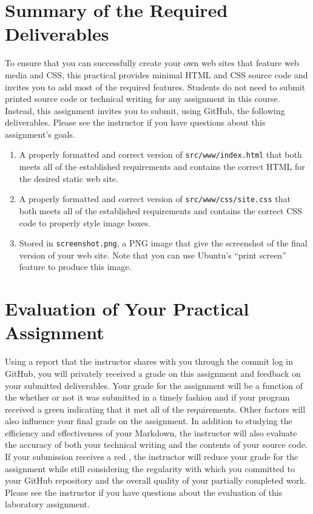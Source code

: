 \documentclass[11pt]{article}
\newcommand{\mainprogramsource}{\lstinline{src/www/index.html}}
\newcommand{\secondprogramsource}{\lstinline{src/www/css/site.css}}
\newcommand{\screenshot}{\lstinline{screenshot.png}}
\newcommand{\checkmark}{\ding{51}}
\newcommand{\naughtmark}{\ding{55}}
\begin{document}
\section*{Summary of the Required Deliverables}

\noindent To ensure that you can successfully create your own web sites that
feature web media and CSS, this practical provides minimal HTML and CSS source
code and invites you to add most of the required features. Students do not need
to submit printed source code or technical writing for any assignment in this
course. Instead, this assignment invites you to submit, using GitHub, the
following deliverables. Please see the instructor if you have questions about
this assignment's goals.

\vspace*{-.05in}

\begin{enumerate}

  \setlength{\itemsep}{0in}

\item A properly formatted and correct version of \mainprogramsource{} that both
  meets all of the established requirements and contains the correct HTML for
  the desired static web site.

\item A properly formatted and correct version of \secondprogramsource{} that
  both meets all of the established requirements and contains the correct CSS
  code to properly style image boxes.

\item Stored in \screenshot{}, a PNG image that give the screenshot of the final
  version of your web site. Note that you can use Ubuntu's ``print screen''
  feature to produce this image.

\end{enumerate}

\vspace*{-.1in}

\section*{Evaluation of Your Practical Assignment}

Using a report that the instructor shares with you through the commit log in
GitHub, you will privately received a grade on this assignment and feedback on
your submitted deliverables. Your grade for the assignment will be a function of
the whether or not it was submitted in a timely fashion and if your program
received a green \checkmark{} indicating that it met all of the requirements.
Other factors will also influence your final grade on the assignment. In
addition to studying the efficiency and effectiveness of your Markdown, the
instructor will also evaluate the accuracy of both your technical writing and
the contents of your source code. If your submission receives a red
\naughtmark{}, the instructor will reduce your grade for the assignment while
still considering the regularity with which you committed to your GitHub
repository and the overall quality of your partially completed work. Please see
the instructor if you have questions about the evaluation of this laboratory
assignment.
\end{document}
